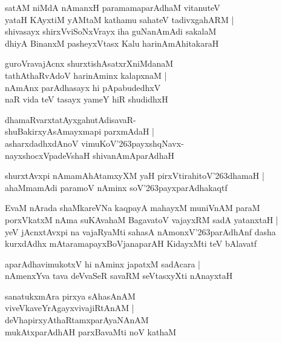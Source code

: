 \begin{shloka}
satAM niMdA nAmanxH paramamaparAdhaM vitanuteV \\
yataH KAyxtiM yAMtaM kathamu sahateV tadivxgahARM |\\
shivasayx shirxVviSoNxVrayx iha guNanAmAdi sakalaM \\
dhiyA BinanxM pasheyxVtasx Kalu harinAmAhitakaraH
\end{shloka}

\begin{shloka}
guroVravajAcnx shurxtishAsatxrXniMdanaM \\
tathAthaRvAdoV harinAminx kalapxnaM |\\
nAmAnx parAdhasayx hi pApabudedhxV\\
naR vida teV tasayx yameY hiR shudidhxH
\end{shloka}

\begin{shloka}
dhamaRvarxtatAyxgahutAdisavaR-\\
shuBakirxyAsAmayxmapi parxmAdaH |\\
asharxdadhxdAnoV vimuKoV\char'263payxshqNavx-\\
nayxshocxVpadeVshaH shivanAmAparAdhaH
\end{shloka}

\begin{shloka}
shurxtAvxpi nAmamAhAtamxyXM yaH pirxVtirahitoV\char'263dhamaH |\\
ahaMmamAdi paramoV nAminx soV\char'263payxparAdhakaqtf
\end{shloka}

\begin{shloka}
EvaM nArada shaMkareVNa kaqpayA mahayxM muniVnAM paraM\\
porxVkatxM nAma suKAvahaM BagavatoV vajayxRM sadA yatanxtaH |\\
yeV jAcnxtAvxpi na vajaRyaMti sahasA nAmonxV\char'263parAdhAnf dasha\\
kurxdAdhx mAtaramapayxBoVjanaparAH KidayxMti teV bAlavatf 
\end{shloka}

\begin{shloka}
aparAdhavimukotxV hi nAminx japatxM sadAcara |\\
nAmenxYva tava deVvaSeR savaRM seVtasxyXti nAnayxtaH
\end{shloka}

\begin{shloka}
sanatukxmAra pirxya sAhasAnAM\\
viveVkaveYrAgayxvivajiRtAnAM |\\
deVhapirxyAthaRtamxparAyaNAnAM\\
mukAtxparAdhAH parxBavaMti noV kathaM
\end{shloka}

